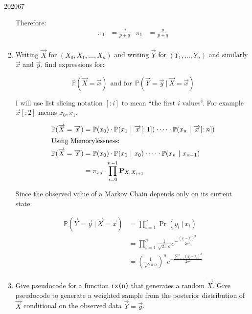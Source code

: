 \documentclass[10pt,\jkfside,a4paper]{article}
\begin{document}
\begin{examquestion}{2020}{6}{7}
\begin{enumerate}[label=(\alph*)]
Therefore:
\begin{align*}
\pi_0 &= \frac{q}{p + q} & \pi_1 &= \frac{p}{p + q} \\
\end{align*}

\item Writing $\overrightarrow{X}$ for $(X_0, X_1, \dots, X_n)$ and writing
$ \overrightarrow{Y} $ for $(Y_1, \dots, Y_n)$ and similarly $ \overrightarrow{x} $
and $ \overrightarrow{y} $, find expressions for:

\[
\mathbb{P}( \overrightarrow{X} = \overrightarrow{x} ) \ \ \text{and for} \ \
\mathbb{P}( \overrightarrow{Y} = \overrightarrow{y} \ | \ \overrightarrow{X}
 = \overrightarrow{x} )
\]

I will use list slicing notation $[:i]$ to mean ``the first $i$ values''.
For example $ \overrightarrow{x}[:2] $ means $x_0, x_1$.

\[
\begin{split}
\mathbb{P}( \overrightarrow{X} = \overrightarrow{x} ) &=
\mathbb{P}(x_0) \cdot \mathbb{P}(x_1 \ | \ \overrightarrow{x}[:1] ) \cdot
\dots \cdot \mathbb{P}(x_n \ | \ \overrightarrow{x}[:n] ) \\
\intertext{Using Memorylessness:}
\mathbb{P}( \overrightarrow{X} = \overrightarrow{x} ) &=
\mathbb{P}(x_0) \cdot \mathbb{P}(x_1 \ | \ x_0 ) \cdot
\dots \cdot \mathbb{P}(x_n \ | \ x_{n-1} ) \\
&= \pi_{x_0} \cdot \prod^{n-1}_{i=0} \mathbf{P}_{X_i X_{i+1}} \\
\end{split}
\]

Since the observed value of a Markov Chain depends only on its current state:

\[
\begin{split}
\mathbb{P}( \overrightarrow{Y} = \overrightarrow{y} \ | \ \overrightarrow{X}
= \overrightarrow{x} )
&= \prod^{n}_{i=1} \Pr(y_i \ | \ x_i) \\
&= \prod^{n}_{i=1} \frac{1}{\sqrt{2\pi} \sigma} e^{-\frac{(y_i - x_i)^2
}{2\sigma^2}} \\
&= \left(\frac{1}{\sqrt{2\pi} \sigma}\right)^n e^{-\frac{\sum^n_{i=1}(y_i -
x_i)^2
}{2\sigma^2}} \\
\end{split}
\]

\item Give pseudocode for a function \texttt{rx(n)} that generates a random
$ \overrightarrow{X} $. Give pseudocode to generate a weighted sample from
the posterior distribution of $ \overrightarrow{X} $ conditional on the
observed data $ \overrightarrow{Y} = \overrightarrow{y} $.


\end{enumerate}
\end{examquestion}
\end{document}
